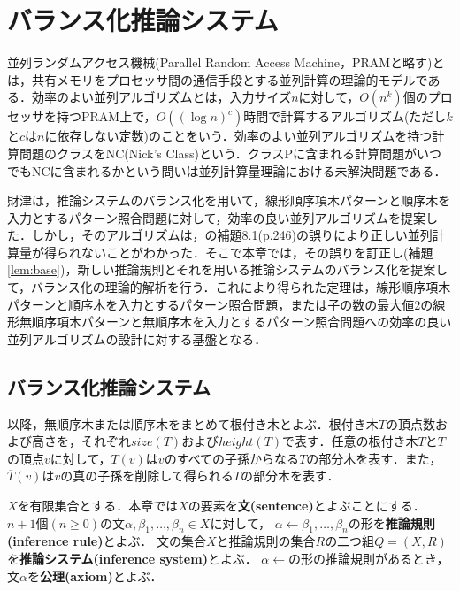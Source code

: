 \chapter{バランス化推論システム}


並列ランダムアクセス機械(Parallel Random Access Machine，PRAMと略す)とは，共有メモリをプロセッサ間の通信手段とする並列計算の理論的モデルである\cite{greenlaw-parallel1995, miyano-parallel1993}．効率のよい並列アルゴリズムとは，入力サイズ$n$に対して，$O(n^k)$個のプロセッサを持つPRAM上で，$O((\log n)^{c})$時間で計算するアルゴリズム(ただし$k$と$c$は$n$に依存しない定数)のことをいう．効率のよい並列アルゴリズムを持つ計算問題のクラスをNC(Nick's Class)という．クラスPに含まれる計算問題がいつでもNCに含まれるかという問いは並列計算量理論における未解決問題である．

財津\cite{zaitsu}は，推論システムのバランス化を用いて，線形順序項木パターンと順序木を入力とするパターン照合問題に対して，効率の良い並列アルゴリズムを提案した．しかし，そのアルゴリズムは，\cite{miyano-parallel1993}の補題8.1(p.246)の誤りにより正しい並列計算量が得られないことがわかった．そこで本章では，その誤りを訂正し(補題\ref{lem:base})，新しい推論規則とそれを用いる推論システムのバランス化を提案して，バランス化の理論的解析を行う．これにより得られた定理は，線形順序項木パターンと順序木を入力とするパターン照合問題，または子の数の最大値2の線形無順序項木パターンと無順序木を入力とするパターン照合問題への効率の良い並列アルゴリズムの設計に対する基盤となる．

\section{バランス化推論システム}
以降，無順序木または順序木をまとめて根付き木とよぶ．根付き木$T$の頂点数および高さを，それぞれ$size(T)$および$height(T)$で表す．任意の根付き木$T$と$T$の頂点$v$に対して，$T(v)$は$v$のすべての子孫からなる$T$の部分木を表す．また，$\overline{T}(v)$は$v$の真の子孫を削除して得られる$T$の部分木を表す．

$X$を有限集合とする．本章では$X$の要素を\textbf{文(sentence)}とよぶことにする．
$n+1$個$(n\geq 0)$の文$\alpha,\beta_{1},\ldots,\beta_{n}\in X$に対して，
$\alpha \leftarrow \beta_{1}, \ldots, \beta_{n}$の形を\textbf{推論規則(inference rule)}とよぶ．
文の集合$X$と推論規則の集合$R$の二つ組$Q=(X,R)$を\textbf{推論システム(inference system)}とよぶ．
$\alpha \leftarrow$の形の推論規則があるとき，文$\alpha$を\textbf{公理(axiom)}とよぶ．

